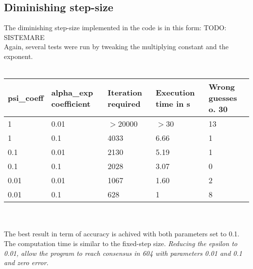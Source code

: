 \documentclass[a4paper,11pt,oneside]{book}
\begin{document}
\subsection{Diminishing step-size} \label{Subsec2.2.5}
The diminishing step-size implemented in the code is in this form:
TODO: SISTEMARE
\\
Again, several tests were run by tweaking the multiplying constant and the exponent.\\ \\
\begin{tabularx}{\textwidth}{|X|X|X|X|X|}
\hline
\textbf{psi\_coeff} & \textbf{alpha\_exp coefficient} & \textbf{Iteration required} & \textbf{Execution time in s} & \textbf{Wrong guesses o. 30}\\
\hline
1 & 0.01 & $>$20000 & $>$30 & 13\\
\hline
1 & 0.1 & 4033 & 6.66 & 1\\
\hline
0.1 & 0.01 & 2130 & 5.19 & 1\\
\hline
0.1 & 0.1 & 2028 & 3.07 & 0\\
\hline
0.01 & 0.01 & 1067 & 1.60 & 2\\
\hline
0.01 & 0.1 & 628 & 1 & 8\\
\hline
\end{tabularx}
\\ \\
The best result in term of accuracy is achived with both parameters set to 0.1. The computation time is similar to the fixed-step size. \textit{Reducing the epsilon to 0.01, allow the program to reach consensus in 604 with parameters 0.01 and 0.1 and zero error.}
\end{document}
